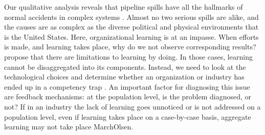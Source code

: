 \documentclass[12pt, man, natbib]{apa6}
\begin{document}
	Our qualitative analysis reveals that pipeline spills have all the hallmarks of normal accidents in complex systems \citep{Perrow1984}. Almost no two serious spills are alike, and the causes are as complex as the diverse political and physical environments that is the United States. Here, organizational learning is at an impasse. When efforts is made, and learning takes place, why do we not observe corresponding results? \citet{Levitt1988} propose that there are limitations to learning by doing. In those cases, learning cannot be disaggregated into its components. Instead, we need to look at the technological choices and determine whether an organization or industry has ended up in a competency trap \citep{Levitt1988}. An important factor for diagnosing this issue are feedback mechanisms: at the population level, is the problem diagnosed, or not? If in an industry the lack of learning goes unnoticed or is not addressed on a population level, even if learning takes place on a case-by-case basis, aggregate learning may not take place {MarchOlsen}.   
	



	
	
	
\end{document}
